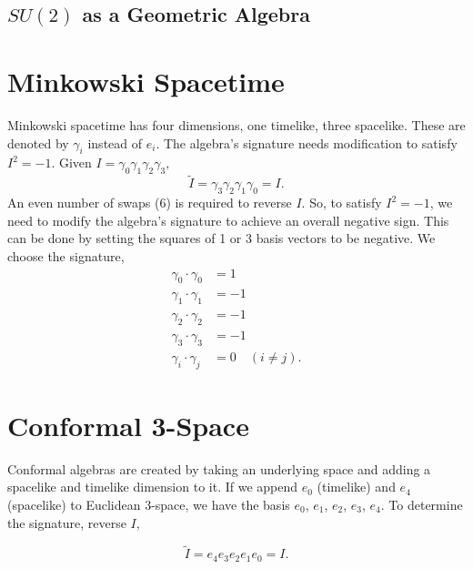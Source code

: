 	\subsection{$SU\left( 2\right) $ as a Geometric Algebra}
	
	\section{Minkowski Spacetime}
	
	Minkowski spacetime has four dimensions, one timelike, three spacelike. These are denoted by $\gamma_i$ instead of $e_i$. The algebra's signature needs modification to satisfy $I^2 = -1$. Given $I = \gamma_0\gamma_1\gamma_2\gamma_3,$
	\[
	\tilde{I} = \gamma_3\gamma_2\gamma_1\gamma_0 = I.
	\]
	An even number of swaps (6) is required to reverse $I$. So, to satisfy $I^2=-1$, we need to modify the algebra's signature to achieve an overall negative sign. This can be done by setting the squares of 1 or 3 basis vectors to be negative. We choose the signature,
	\begin{align*}
	\gamma_0 \cdot \gamma_0 & = 1\\
	\gamma_1 \cdot \gamma_1 & = -1\\
	\gamma_2 \cdot \gamma_2 & = -1\\		
	\gamma_3 \cdot \gamma_3 & = -1\\
	\gamma_i \cdot \gamma_j & = 0 \quad \left(i\neq j\right).
	\end{align*}
	
	\section{Conformal 3-Space}
	
	Conformal algebras are created by taking an underlying space and adding a spacelike and timelike dimension to it. If we append $e_0$ (timelike) and $e_4$ (spacelike) to Euclidean 3-space, we have the basis $e_0$, $e_1$, $e_2$, $e_3$, $e_4$. To determine the signature, reverse $I$,
	  
	\[
	\tilde{I} = e_4e_3e_2e_1e_0 = I.
	\]
		
